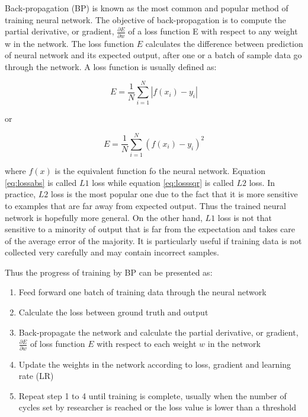 Back-propagation (BP) \cite{Rumelhart1986} is known as the most common and popular method of training neural network. The objective of back-propagation is to compute the partial derivative, or gradient, $\frac{\partial E}{\partial w}$ of a loss function E with respect to any weight w in the network. The loss function
$E$ calculates the difference between prediction of neural network and its expected output, after one or a batch of sample data go through the network. A loss function is usually defined as:

\begin{equation} \label{eq:lossabs}
E=\frac{1}{N}\sum_{i=1}^{N}|f(x_i)-y_i| 
\end{equation}

or

\begin{equation} \label{eq:losssqr}
E=\frac{1}{N}\sum_{i=1}^{N}(f(x_i)-y_i)^{2} 
\end{equation}

where $f(x)$ is the equivalent function fo the neural network. Equation \ref{eq:lossabs} is called $L1$ loss while equation \ref{eq:losssqr} is called $L2$ loss. In practice, $L2$ loss is the most popular one due to the fact that it is more sensitive to examples that are far away from expected output. 
Thus the trained neural network is hopefully more general. 
On the other hand, $L1$ loss is not that sensitive to a minority of output that is far from the expectation and takes care of the average error of the majority. 
It is particularly useful if training data is not collected very carefully and may contain incorrect samples.

Thus the progress of training by BP can be presented as:

\begin{enumerate}
  \item Feed forward one batch of training data through the neural network
  \item Calculate the loss between ground truth and output
  \item Back-propagate the network and calculate the partial derivative, or gradient, $\frac{\partial E}{\partial w}$
  of loss function $E$ with respect to each weight $w$ in the network
  \item Update the weights in the network according to loss, gradient and learning rate (LR)
  \item Repeat step 1 to 4 until training is complete, usually when the number of cycles set by researcher is reached or the loss value is lower than a threshold
\end{enumerate}

